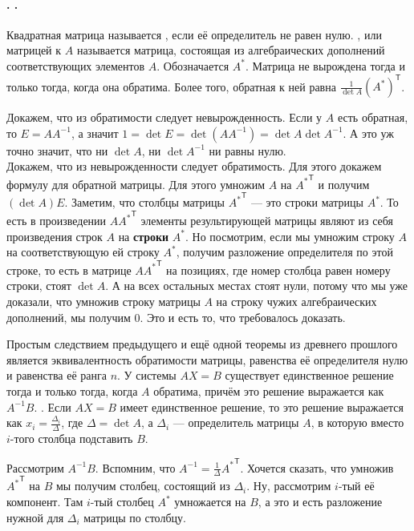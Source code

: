 \documentclass{article}
\newcommand*{\trans}{^{\mathsf T}}
\begin{document}
    \paragraph{. .}
    \begin{itemize}
        \dfn Квадратная матрица называется , если её определитель не равен нулю.
        \dfn {},  или  матрицей к $A$ называется матрица, состоящая из алгебраических дополнений соответствующих элементов $A$. Обозначается $A^*$.
        \thm Матрица не вырождена тогда и только тогда, когда она обратима. Более того, обратная к ней равна $\frac1{\det A}(A^*)\trans$.
        \begin{Proof}
            Докажем, что из обратимости следует невырожденность. Если у $A$ есть обратная, то $E=AA^{-1}$, а значит $1=\det E=\det(AA^{-1})=\det A\det A^{-1}$. А это уж точно значит, что ни $\det A$, ни $\det A^{-1}$ ни равны нулю.\\
            Докажем, что из невырожденности следует обратимость. Для этого докажем формулу для обратной матрицы. Для этого умножим $A$ на ${A^*}\trans$ и получим $(\det A)E$. Заметим, что столбцы матрицы ${A^*}\trans$ --- это строки матрицы $A^*$. То есть в произведении $A{A^*}\trans$ элементы результирующей матрицы являют из себя произведения строк $A$ на \textbf{строки} $A^*$. Но посмотрим, если мы умножим строку $A$ на соответствующую ей строку $A^*$, получим разложение определителя по этой строке, то есть в матрице $A{A^*}\trans$ на позициях, где номер столбца равен номеру строки, стоят $\det A$. А на всех остальных местах стоят нули, потому что мы уже доказали, что умножив строку матрицы $A$ на строку чужих алгебраических дополнений, мы получим 0. Это и есть то, что требовалось доказать.
        \end{Proof}
        \thm Простым следствием предыдущего и ещё одной теоремы из древнего прошлого является эквивалентность обратимости матрицы, равенства её определителя нулю и равенства её ранга $n$.
        \thm У системы $AX=B$ существует единственное решение тогда и только тогда, когда $A$ обратима, причём это решение выражается как $A^{-1}B$.
        \thm {}. Если $AX=B$ имеет единственное решение, то это решение выражается как $x_i=\frac{\Delta_i}\Delta$, где $\Delta=\det A$, а $\Delta_i$ --- определитель матрицы $A$, в которую вместо $i$-того столбца подставить $B$.
        \begin{Proof}
            Рассмотрим $A^{-1}B$. Вспомним, что $A^{-1}=\frac1\Delta{A^*}\trans$. Хочется сказать, что умножив ${A^*}\trans$ на $B$ мы получим столбец, состоящий из $\Delta_i$. Ну, рассмотрим $i$-тый её компонент. Там $i$-тый столбец $A^*$ умножается на $B$, а это и есть разложение нужной для $\Delta_i$ матрицы по столбцу.
        \end{Proof}
    \end{itemize}
\end{document}
